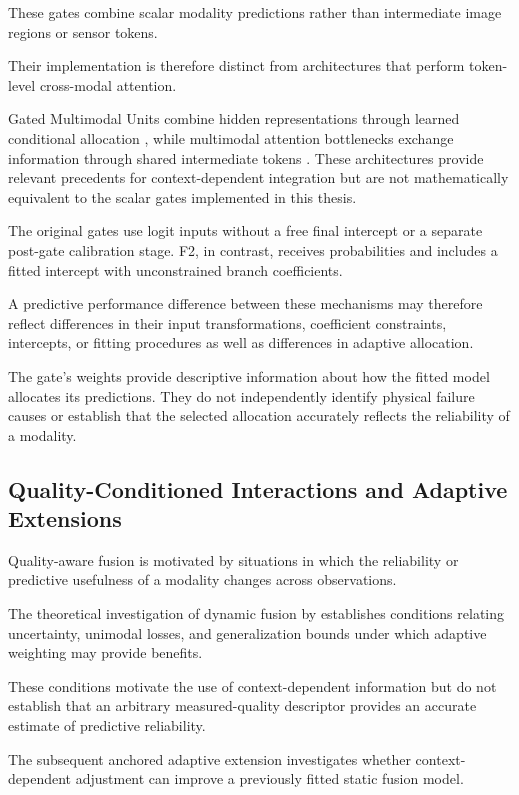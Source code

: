 These gates combine scalar modality predictions rather than intermediate image regions or sensor tokens.

Their implementation is therefore distinct from architectures that perform token-level cross-modal attention.

Gated Multimodal Units combine hidden representations through learned conditional allocation \parencite{P006}, while multimodal attention bottlenecks exchange information through shared intermediate tokens \parencite{Nagrani2021MBT}. These architectures provide relevant precedents for context-dependent integration but are not mathematically equivalent to the scalar gates implemented in this thesis.

The original gates use logit inputs without a free final intercept or a separate post-gate calibration stage. F2, in contrast, receives probabilities and includes a fitted intercept with unconstrained branch coefficients.

A predictive performance difference between these mechanisms may therefore reflect differences in their input transformations, coefficient constraints, intercepts, or fitting procedures as well as differences in adaptive allocation.

The gate’s weights provide descriptive information about how the fitted model allocates its predictions. They do not independently identify physical failure causes or establish that the selected allocation accurately reflects the reliability of a modality.

\subsection{Quality-Conditioned Interactions and Adaptive Extensions}

Quality-aware fusion is motivated by situations in which the reliability or predictive usefulness of a modality changes across observations.

The theoretical investigation of dynamic fusion by \textcite{Zhang2023QMF} establishes conditions relating uncertainty, unimodal losses, and generalization bounds under which adaptive weighting may provide benefits.

These conditions motivate the use of context-dependent information but do not establish that an arbitrary measured-quality descriptor provides an accurate estimate of predictive reliability.

The subsequent anchored adaptive extension investigates whether context-dependent adjustment can improve a previously fitted static fusion model.

